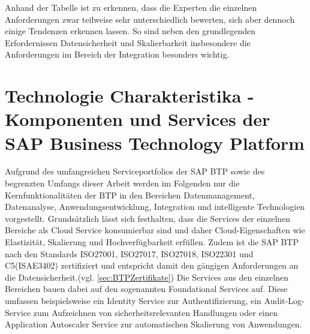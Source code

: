 

Anhand der Tabelle ist zu erkennen, dass die Experten die einzelnen Anforderungen zwar teilweise sehr unterschiedlich bewerten, sich aber dennoch einige Tendenzen erkennen lassen. So sind neben den grundlegenden Erfordernissen Datensicherheit und Skalierbarkeit insbesondere die Anforderungen im Bereich der Integration besonders wichtig. 










\section{Technologie Charakteristika - Komponenten und Services der SAP Business Technology Platform}\label{sec:TechCharak}


Aufgrund des umfangreichen Serviceportfolios der SAP BTP sowie des begrenzten Umfangs dieser Arbeit werden im Folgenden nur die Kernfunktionalitäten der BTP in den Bereichen Datenmanagement, Datenanalyse, Anwendungsentwicklung, Integration und intelligente Technologien vorgestellt. Grundsätzlich lässt sich festhalten, dass die Services der einzelnen Bereiche als Cloud Service konsumierbar sind und daher Cloud-Eigenschaften wie Elastizität, Skalierung und Hochverfügbarkeit erfüllen. \autocite[Vgl.][S. 60]{SEUBERT} Zudem ist die SAP BTP nach den Standards ISO27001, ISO27017, ISO27018, ISO22301 und C5(ISAE3402) zertifiziert und entspricht damit den gängigen Anforderungen an die Datensicherheit.(vgl. \ref{sec:BTPZertifikate}) Die Services aus den einzelnen Bereichen bauen dabei auf den sogenannten Foundational Services auf. Diese umfassen beispielsweise ein Identity Service zur Authentifizierung, ein Audit-Log-Service zum Aufzeichnen von sicherheitsrelevanten Handlungen oder einen Application Autoscaler Service zur automatischen Skalierung von Anwendungen. \autocite[Vgl.][S. 58]{SEUBERT}


